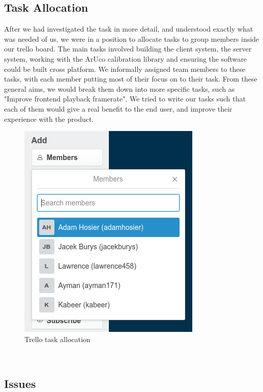\documentclass{article}
\begin{document}
\subsection{Task Allocation}
After we had investigated the task in more detail, and understood exactly what was needed of us, we were in a position to allocate tasks to group members inside our trello board. The main tasks involved building the client system, the server system, working with the ArUco calibration library and ensuring the software could be built cross platform. We informally assigned team members to these tasks, with each member putting most of their focus on to their task. From these general aims, we would break them down into more specific tasks, such as "Improve frontend playback framerate". We tried to write our tasks such that each of them would give a real benefit to the end user, and improve their experience with the product.
\begin{figure}[h]
  \centering
  \includegraphics[scale=0.5]{trello2}
  \caption{Trello task allocation}
  \label{fig:trello}
\end{figure}
\\ 
\newpage
\subsection{Issues}
\end{document}
